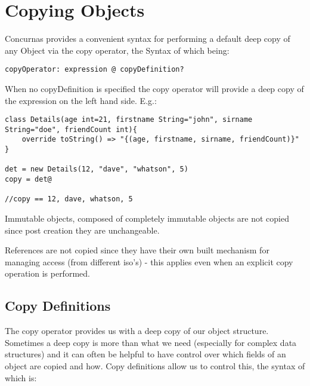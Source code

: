 \documentclass[conc-doc]{subfiles}
\begin{document}
	
	\chapter[Copying Objects]{Copying Objects}


Concurnas provides a convenient syntax for performing a default deep copy of any Object via the copy operator, the Syntax of which being:
\begin{center}
	\lstinline{copyOperator: expression @ copyDefinition?}
\end{center}

When no copyDefinition is specified the copy operator will provide a deep copy of the expression on the left hand side. E.g.:

\begin{lstlisting}
class Details(age int=21, firstname String="john", sirname String="doe", friendCount int){
	override toString() => "{(age, firstname, sirname, friendCount)}"
}

det = new Details(12, "dave", "whatson", 5)
copy = det@

//copy == 12, dave, whatson, 5
\end{lstlisting}

Immutable objects, composed of completely immutable objects are not copied since post creation they are unchangeable. 

References are not copied since they have their own built mechanism for managing access (from different iso's) - this applies even when an explicit copy operation is performed.

\section{Copy Definitions}
The copy operator provides us with a deep copy of our object structure. Sometimes a deep copy is more than what we need (especially for complex data structures) and it can often be helpful to have control over which fields of an object are copied and how. Copy definitions allow us to control this, the syntax of which is:
\end{document}

